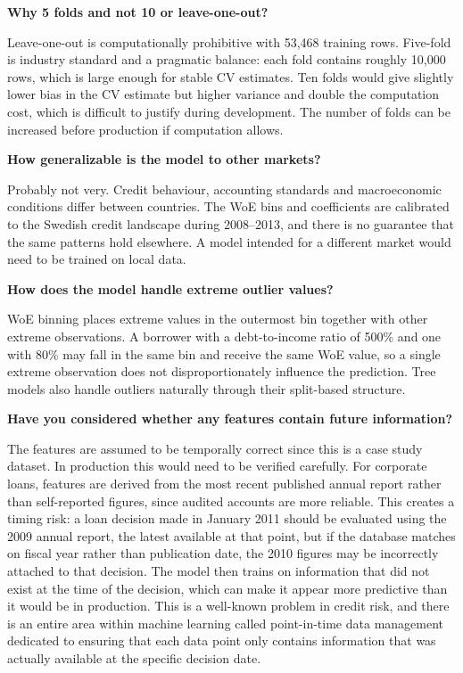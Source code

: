 \documentclass[a4paper,11pt]{article}
\begin{document}
\textbf{Why 5 folds and not 10 or leave-one-out?}

Leave-one-out is computationally prohibitive with 53{,}468 training rows. Five-fold
is industry standard and a pragmatic balance: each fold contains roughly 10{,}000
rows, which is large enough for stable CV estimates. Ten folds would give slightly
lower bias in the CV estimate but higher variance and double the computation cost,
which is difficult to justify during development. The number of folds can be
increased before production if computation allows.

\textbf{How generalizable is the model to other markets?}

Probably not very. Credit behaviour, accounting standards and macroeconomic
conditions differ between countries. The WoE bins and coefficients are calibrated
to the Swedish credit landscape during 2008--2013, and there is no guarantee that
the same patterns hold elsewhere. A model intended for a different market would
need to be trained on local data.

\textbf{How does the model handle extreme outlier values?}

WoE binning places extreme values in the outermost bin together with other extreme
observations. A borrower with a debt-to-income ratio of 500\% and one with 80\%
may fall in the same bin and receive the same WoE value, so a single extreme
observation does not disproportionately influence the prediction. Tree models also
handle outliers naturally through their split-based structure.

\textbf{Have you considered whether any features contain future information?}

The features are assumed to be temporally correct since this is a case study dataset.
In production this would need to be verified carefully. For corporate loans, features
are derived from the most recent published annual report rather than self-reported
figures, since audited accounts are more reliable. This creates a timing risk: a loan
decision made in January 2011 should be evaluated using the 2009 annual report, the
latest available at that point, but if the database matches on fiscal year rather than
publication date, the 2010 figures may be incorrectly attached to that decision. The
model then trains on information that did not exist at the time of the decision, which
can make it appear more predictive than it would be in production. This is a
well-known problem in credit risk, and there is an entire area within machine learning
called point-in-time data management dedicated to ensuring that each data point only
contains information that was actually available at the specific decision date.
\end{document}
